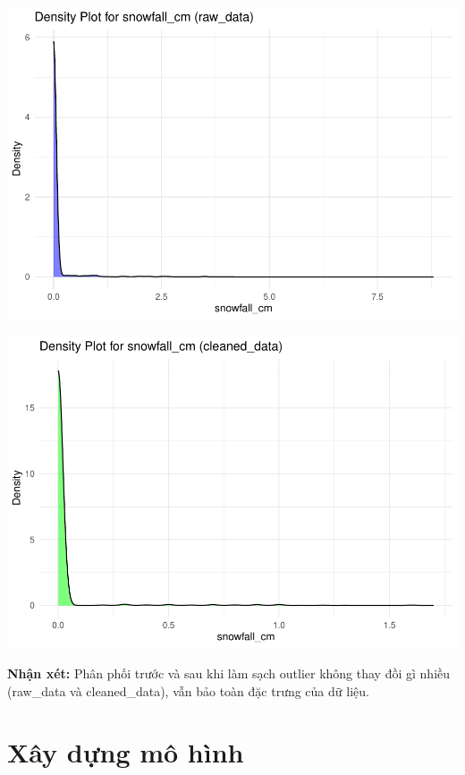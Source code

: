 \documentclass[
  11pt,
  letterpaper,
]{article}
\begin{document}
\begin{center}\includegraphics[width=1.2\linewidth,]{Final_Project_files/figure-latex/unnamed-chunk-15-17} \end{center}

\begin{center}\includegraphics[width=1.2\linewidth,]{Final_Project_files/figure-latex/unnamed-chunk-15-18} \end{center}

\textbf{Nhận xét:} Phân phối trước và sau khi làm sạch outlier không thay đồi gì nhiều (raw\_data và cleaned\_data), vẫn bảo toàn đặc trưng của dữ liệu.

\section{Xây dựng mô hình}
\end{document}
